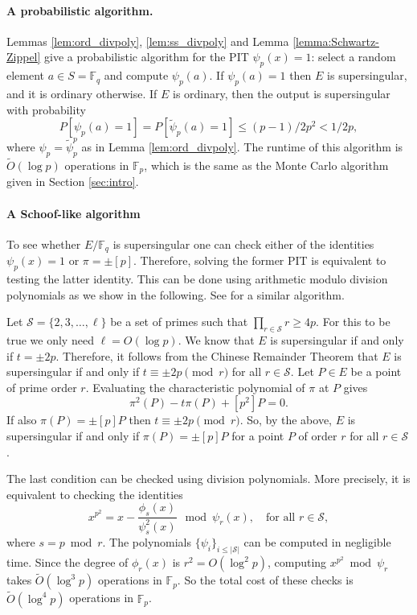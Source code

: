 \documentclass[12pt]{article}
\theoremstyle{plain}
\theoremstyle{definition}
\newcommand{\abs}[1]{\left\vert#1\right\vert}
\newcommand{\tildO}{\tilde{O}}
\def\F{\ensuremath{\mathbb{F}}}
\begin{document}
\paragraph{A probabilistic algorithm.}
Lemmas \ref{lem:ord_divpoly}, \ref{lem:ss_divpoly} and Lemma \ref{lemma:Schwartz-Zippel} give a 
probabilistic algorithm for the PIT $\psi_p(x) = 1$: select a random element $a \in S = \F_q$ and 
compute $\psi_p(a)$. If $\psi_p(a) = 1$ then $E$ is supersingular, and it is ordinary otherwise. If 
$E$ is ordinary, then the output is supersingular with probability 
\[ P[\psi_p(a) = 1] = P[\tilde{\psi}_p(a) = 1] \le (p - 1) / 2p^2 < 1 / 2p, \] 
where $\psi_p = \tilde{\psi}_p^p$ as in Lemma \ref{lem:ord_divpoly}. The runtime of this algorithm 
is $\tildO(\log p)$ operations in $\F_p$, which is the same as the Monte Carlo algorithm given in 
Section \ref{sec:intro}.

\paragraph{A Schoof-like algorithm}
To see whether $E/\F_q$ is supersingular one can check either of the identities $\psi_p(x) = 1$ or 
$\pi = \pm [p]$. Therefore, solving the former PIT is equivalent to testing the latter identity. 
This can be done using arithmetic modulo division polynomials as we show in the following. See 
\cite[Section 2.2]{sutherland2012} for a similar algorithm.

Let $\mathcal{S} = \{2, 3, \dots, \ell\}$ be a set of primes such that $\prod_{r \in \mathcal{S}} r 
\ge 4p$. For this to be true we only need $\ell = O(\log p)$. We know that $E$ is supersingular if 
and only if $t = \pm 2p$. Therefore, it follows from the Chinese Remainder Theorem that $E$ is 
supersingular if and only if $t \equiv \pm 2p \pmod{r}$ for all $r \in \mathcal{S}$. Let $P \in E$ 
be a point of prime order $r$. Evaluating the characteristic polynomial of $\pi$ at $P$ gives
\[ \pi^2(P) - t\pi(P) + [p^2]P = 0. \]
If also $\pi(P) = \pm [p]P$ then $t \equiv \pm 2p \pmod{r}$. So, by the above, $E$ is supersingular 
if and only if $\pi(P) = \pm [p]P$ for a point $P$ of order $r$ for all $r \in \mathcal{S}$.

The last condition can be checked using division polynomials. More precisely, it is equivalent to 
checking the identities
\begin{equation}
\label{equ:schoof}
	x^{p^2} = x - \frac{\phi_s(x)}{\psi_s^2(x)} ~ \bmod \psi_r(x), \quad \text{for all } r \in 
	\mathcal{S},
\end{equation}
where $s = p \bmod r$. The polynomials $\{ \psi_i \}_{i \le \abs{\mathcal{S}}}$ can be computed in 
negligible time. Since the degree of $\phi_r(x)$ is $r^2 = O(\log^2 p)$, computing $x^{p^2} \bmod 
\psi_r$ takes $\tildO(\log^3 p)$ operations in $\F_p$. So the total cost of these checks is 
$\tildO(\log^4 p)$ operations in $\F_p$.
\end{document}
